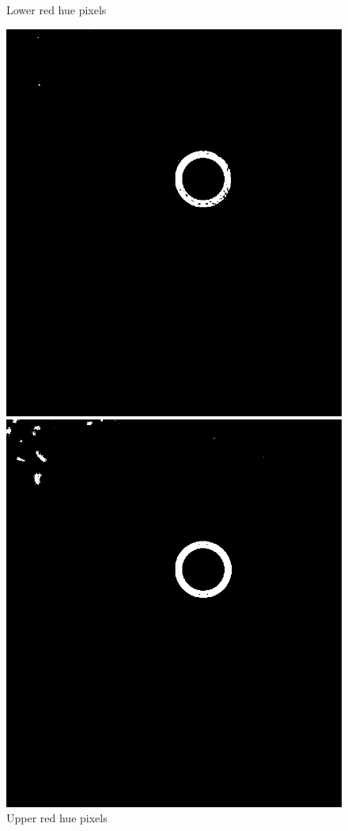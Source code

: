 \begin{figure}[H]
	\caption{Lower red hue pixels}\label{fig:lower_red}
	\endminipage\hfill
	\includegraphics[width=\linewidth]{images/upperred.png}
	\caption{Upper red hue pixels}\label{fig:upper_red}
	\endminipage\hfill
	\newline
	\newline
	\includegraphics[width=\linewidth]{images/redcombined1.png}

\end{figure}
